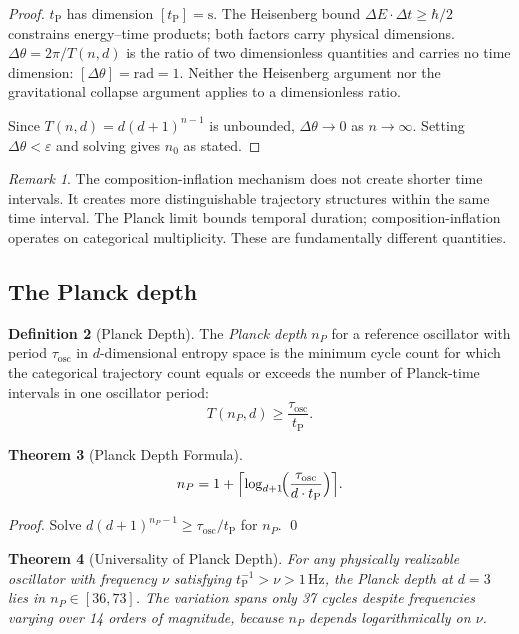 \documentclass[twocolumn,10pt,a4paper]{article}
\theoremstyle{thmstyle}
\newtheorem{theorem}{Theorem}[section]
\theoremstyle{definition}
\newtheorem{definition}[theorem]{Definition}
\theoremstyle{remark}
\newtheorem{remark}[theorem]{Remark}
\newcommand{\tP}{t_{\mathrm{P}}}
\begin{document}
\begin{proof}
$\tP$ has dimension $[\tP] = \mathrm{s}$. The Heisenberg bound
$\Delta E \cdot \Delta t \geq \hbar/2$ constrains energy--time products;
both factors carry physical dimensions.
$\Delta\theta = 2\pi/T(n,d)$ is the ratio of two dimensionless quantities
and carries no time dimension: $[\Delta\theta] = \mathrm{rad} = 1$.
Neither the Heisenberg argument nor the gravitational collapse argument
applies to a dimensionless ratio.

Since $T(n,d) = d(d+1)^{n-1}$ is unbounded, $\Delta\theta \to 0$ as
$n \to \infty$. Setting $\Delta\theta < \varepsilon$ and solving gives $n_0$
as stated.
\end{proof}

\begin{remark}
The composition-inflation mechanism does not create shorter time intervals.
It creates more distinguishable trajectory structures within the same time
interval. The Planck limit bounds temporal duration;
composition-inflation operates on categorical multiplicity. These are
fundamentally different quantities.
\end{remark}

\subsection{The Planck depth}

\begin{definition}[Planck Depth]
\label{def:planckdepth}
The \emph{Planck depth} $n_P$ for a reference oscillator with period
$\tau_{\mathrm{osc}}$ in $d$-dimensional entropy space is the minimum
cycle count for which the categorical trajectory count equals or exceeds
the number of Planck-time intervals in one oscillator period:
\[
T(n_P, d) \geq \frac{\tau_{\mathrm{osc}}}{\tP}.
\]
\end{definition}

\begin{theorem}[Planck Depth Formula]
\label{thm:planckdepth}
\[
n_P = 1 + \Bigl\lceil \log_{d+1}\!\Bigl(\frac{\tau_{\mathrm{osc}}}{d \cdot \tP}\Bigr)\Bigr\rceil.
\]
\end{theorem}

\begin{proof}
Solve $d(d+1)^{n_P - 1} \geq \tau_{\mathrm{osc}}/\tP$ for $n_P$. \qed
\end{proof}

\begin{theorem}[Universality of Planck Depth]
\label{thm:universal}
For any physically realizable oscillator with frequency $\nu$ satisfying
$\tP^{-1} > \nu > 1\,\mathrm{Hz}$, the Planck depth at $d = 3$ lies in
$n_P \in [36, 73]$. The variation spans only 37 cycles despite frequencies
varying over 14 orders of magnitude, because $n_P$ depends logarithmically
on $\nu$.
\end{theorem}
\end{document}
